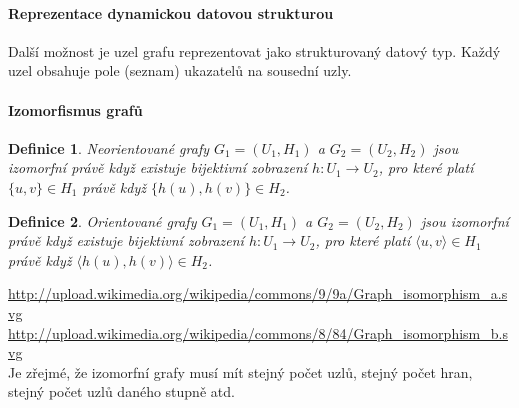 \documentclass[10pt,a4paper]{article}
\newtheorem{definition}{Definice}
\begin{document}
\paragraph{Reprezentace dynamickou datovou strukturou}
Další možnost je uzel grafu reprezentovat jako strukturovaný datový typ. Každý uzel obsahuje pole (seznam) ukazatelů na sousední uzly.
\paragraph{Izomorfismus grafů}
\begin{definition}
Neorientované grafy $G_1 = (U_1, H_1)$ a $G_2 = (U_2, H_2)$ jsou izomorfní právě když existuje bijektivní zobrazení $h: U_1 \rightarrow U_2$, pro které platí $\{u, v\} \in H_1$ právě když $\{h(u), h(v)\} \in H_2$.
\end{definition}
\begin{definition}
Orientované grafy $G_1 = (U_1, H_1)$ a $G_2 = (U_2, H_2)$ jsou izomorfní právě když existuje bijektivní zobrazení $h: U_1 \rightarrow U_2$, pro které platí $\langle u, v\rangle \in H_1$ právě když $\langle h(u), h(v)\rangle \in H_2$.
\end{definition}
\url{http://upload.wikimedia.org/wikipedia/commons/9/9a/Graph_isomorphism_a.svg} \\
\url{http://upload.wikimedia.org/wikipedia/commons/8/84/Graph_isomorphism_b.svg} \\
Je zřejmé, že izomorfní grafy musí mít stejný počet uzlů, stejný počet hran, stejný počet uzlů daného stupně atd.
\end{document}
